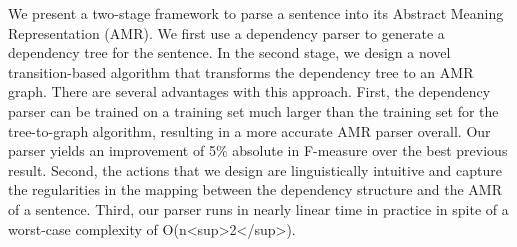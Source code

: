 We present a two-stage framework to parse a sentence into its Abstract Meaning Representation (AMR). We first use a dependency parser to generate a dependency tree for the sentence. In the second stage, we design a novel transition-based algorithm that transforms the dependency tree to an AMR graph. There are several advantages with this approach. First, the dependency parser can be trained on a training set much larger than the training set for the tree-to-graph algorithm, resulting in a more accurate AMR parser overall. Our parser yields an improvement of 5\% absolute in F-measure over the best previous result. Second, the actions that we design are linguistically intuitive and capture the regularities in the mapping between the dependency structure and the AMR of a sentence. Third, our parser runs in nearly linear time in practice in spite of a worst-case complexity of O(n<sup>2</sup>).
